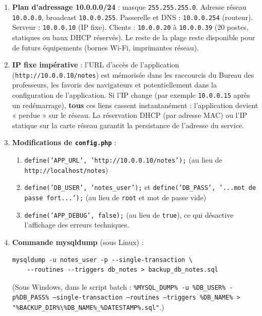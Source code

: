 \documentclass[11pt]{article}
\begin{document}
\begin{corrige}[Exercice 1]
\begin{enumerate}
    \item \textbf{Plan d'adressage 10.0.0.0/24} : masque \texttt{255.255.255.0}. Adresse réseau \texttt{10.0.0.0}, broadcast \texttt{10.0.0.255}. Passerelle et DNS : \texttt{10.0.0.254} (routeur). Serveur : \texttt{10.0.0.10} (IP fixe). Clients : \texttt{10.0.0.20} à \texttt{10.0.0.39} (20 postes, statiques ou baux DHCP réservés). Le reste de la plage reste disponible pour de futurs équipements (bornes Wi-Fi, imprimantes réseau).
    \item \textbf{IP fixe impérative} : l'URL d'accès de l'application (\texttt{http://10.0.0.10/notes}) est mémorisée dans les raccourcis du Bureau des professeurs, les favoris des navigateurs et potentiellement dans la configuration de l'application. Si l'IP change (par exemple \texttt{10.0.0.15} après un redémarrage), \textbf{tous} ces liens cassent instantanément : l'application devient « perdue » sur le réseau. La réservation DHCP (par adresse MAC) ou l'IP statique sur la carte réseau garantit la persistance de l'adresse du service.
    \item \textbf{Modifications de \texttt{config.php}} :
    \begin{enumerate}
        \item \texttt{define('APP\_URL', 'http://10.0.0.10/notes');} (au lieu de \texttt{http://localhost/notes})
        \item \texttt{define('DB\_USER', 'notes\_user');} et \texttt{define('DB\_PASS', '...mot de passe fort...');} (au lieu de \texttt{root} et mot de passe vide)
        \item \texttt{define('APP\_DEBUG', false);} (au lieu de \texttt{true}), ce qui désactive l'affichage des erreurs techniques.
    \end{enumerate}
    \item \textbf{Commande mysqldump} (sous Linux) :
\begin{lstlisting}
mysqldump -u notes_user -p --single-transaction \
    --routines --triggers db_notes > backup_db_notes.sql
\end{lstlisting}
    (Sous Windows, dans le script batch : \texttt{\%MYSQL\_DUMP\% -u \%DB\_USER\% -p\%DB\_PASS\% --single-transaction --routines --triggers \%DB\_NAME\% > "\%BACKUP\_DIR\%\textbackslash\%DB\_NAME\%\_\%DATESTAMP\%.sql"}.)
\end{enumerate}
\end{corrige}
\end{document}
